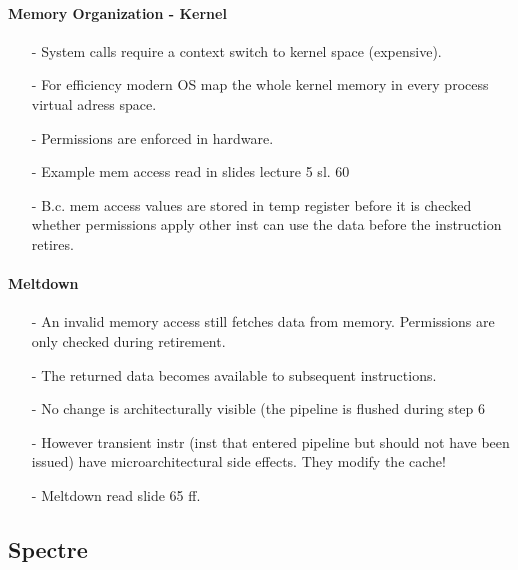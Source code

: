 \paragraph{Memory Organization - Kernel}
\begin{itemize}
    \item[-]System calls require a context switch to kernel space (expensive).
    \item[-]For efficiency modern OS map the whole kernel memory in every process virtual adress space.
    \item[-]Permissions are enforced in hardware.
    \item[-]Example mem access read in slides lecture 5 sl. 60
    \item[-]B.c. mem access values are stored in temp register before it is checked whether permissions apply other inst can use the data before the instruction retires.
\end{itemize}{}

\paragraph{Meltdown}
\begin{itemize}
    \item[-]An invalid memory access still fetches data from memory. Permissions are only checked during retirement.
    \item[-]The returned data becomes available to subsequent instructions.
    \item[-]No change is architecturally visible (the pipeline is flushed during step 6
    \item[-]However transient instr (inst that entered pipeline but should not have been issued) have microarchitectural side effects. They modify the cache!
    \item[-]Meltdown read slide 65 ff.
\end{itemize}{}

\subsection{Spectre}

